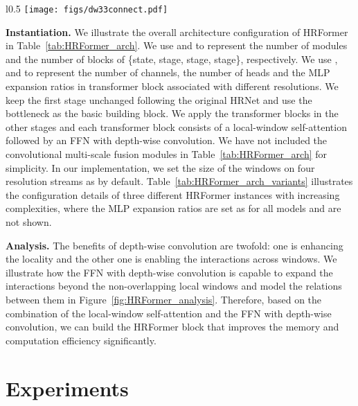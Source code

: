 \documentclass{article}
\begin{document}
\begin{wrapfigure}{l}{0.5\textwidth}
  \small
  \centering
  \texttt{[image: figs/dw33connect.pdf]}\\
  \caption{\small {Illustrating that FFN with  depth-wise convolution connects the non-overlapping windows.}}
  \label{fig:HRFormer_analysis}
\end{wrapfigure}

\vspace{.1cm}
\noindent\textbf{Instantiation.}
We illustrate the overall architecture configuration of HRFormer
in Table~\ref{tab:HRFormer_arch}.
We use  and  to represent the
number of modules and the number of blocks of
\{state, stage, stage, stage\}, respectively.
We use ,  and  to represent
the number of channels, the number of heads and the MLP expansion ratios in transformer block associated with different resolutions.
We keep the first stage unchanged following the original HRNet
and use the bottleneck as the basic building block.
We apply the transformer blocks in the other stages and each
transformer block consists of a local-window self-attention followed
by an FFN with  depth-wise convolution.
We have not included the convolutional multi-scale fusion modules in Table~\ref{tab:HRFormer_arch}
for simplicity.
In our implementation,
we set the size of the windows on four resolution streams
as  by default.
Table~\ref{tab:HRFormer_arch_variants} illustrates the configuration details of three different HRFormer instances with increasing complexities,
where the MLP expansion ratios  are set as  for all models and are not shown.




\vspace{.1cm}
\noindent\textbf{Analysis.}
The benefits of  depth-wise convolution are twofold:
one is enhancing the locality and the other one is enabling the interactions
across windows.
We illustrate how the FFN with depth-wise convolution is capable to expand the
interactions beyond the non-overlapping local windows and model the relations between them in Figure~\ref{fig:HRFormer_analysis}.
Therefore, based on the combination of the local-window self-attention
and the FFN with  depth-wise convolution, we can build the HRFormer block
that improves the memory and computation efficiency significantly.



\section{Experiments}
\end{document}
